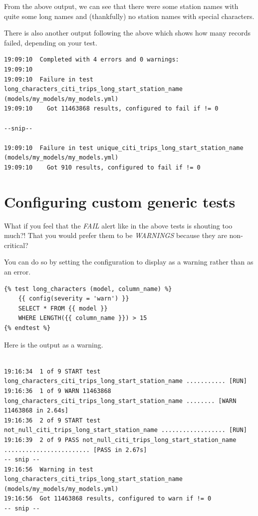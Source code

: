 \documentclass[
]{book}
\begin{document}
From the above output, we can see that there were some station names with quite some long names and (thankfully) no station names with special characters.

There is also another output following the above which shows how many records failed, depending on your test.

\begin{verbatim}
19:09:10  Completed with 4 errors and 0 warnings:
19:09:10  
19:09:10  Failure in test long_characters_citi_trips_long_start_station_name (models/my_models/my_models.yml)
19:09:10    Got 11463868 results, configured to fail if != 0
 
--snip--

19:09:10  Failure in test unique_citi_trips_long_start_station_name (models/my_models/my_models.yml)
19:09:10    Got 910 results, configured to fail if != 0
\end{verbatim}

\hypertarget{configuring-custom-generic-tests}{%
\section{Configuring custom generic tests}\label{configuring-custom-generic-tests}}

What if you feel that the \emph{FAIL} alert like in the above tests is shouting too much?! That you would prefer them to be \emph{WARNINGS} because they are non-critical?

You can do so by setting the configuration to display as a warning rather than as an error.

\begin{verbatim}
{% test long_characters (model, column_name) %}
    {{ config(severity = 'warn') }}
    SELECT * FROM {{ model }}
    WHERE LENGTH({{ column_name }}) > 15 
{% endtest %}
\end{verbatim}

Here is the output as a warning.

\begin{verbatim}

19:16:34  1 of 9 START test long_characters_citi_trips_long_start_station_name ........... [RUN]
19:16:36  1 of 9 WARN 11463868 long_characters_citi_trips_long_start_station_name ........ [WARN 11463868 in 2.64s]
19:16:36  2 of 9 START test not_null_citi_trips_long_start_station_name .................. [RUN]
19:16:39  2 of 9 PASS not_null_citi_trips_long_start_station_name ........................ [PASS in 2.67s]
-- snip --
19:16:56  Warning in test long_characters_citi_trips_long_start_station_name (models/my_models/my_models.yml)
19:16:56  Got 11463868 results, configured to warn if != 0
-- snip --
\end{verbatim}
\end{document}
